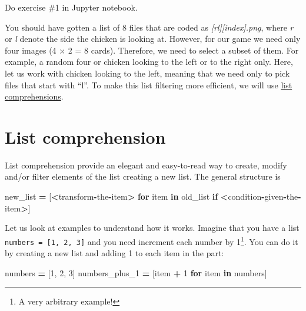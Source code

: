 \documentclass[
]{book}
\newenvironment{Shaded}{\begin{snugshade}}{\end{snugshade}}
\newcommand{\ControlFlowTok}[1]{\textcolor[rgb]{0.13,0.29,0.53}{\textbf{#1}}}
\newcommand{\DecValTok}[1]{\textcolor[rgb]{0.00,0.00,0.81}{#1}}
\newcommand{\KeywordTok}[1]{\textcolor[rgb]{0.13,0.29,0.53}{\textbf{#1}}}
\newcommand{\NormalTok}[1]{#1}
\newcommand{\OperatorTok}[1]{\textcolor[rgb]{0.81,0.36,0.00}{\textbf{#1}}}
\begin{document}
Do exercise \#1 in Jupyter notebook.

You should have gotten a list of 8 files that are coded as \emph{{[}r\textbar l{]}{[}index{]}.png}, where \emph{r} or \emph{l} denote the side the chicken is looking at. However, for our game we need only four images (4 × 2 = 8 cards). Therefore, we need to select a subset of them. For example, a random four or chicken looking to the left or to the right only. Here, let us work with chicken looking to the left, meaning that we need only to pick files that start with ``l''. To make this list filtering more efficient, we will use \href{https://docs.python.org/3/tutorial/datastructures.html\#list-comprehensions}{list comprehensions}.

\hypertarget{list-comprehension}{%
\section{List comprehension}\label{list-comprehension}}

List comprehension provide an elegant and easy-to-read way to create, modify and/or filter elements of the list creating a new list. The general structure is

\begin{Shaded}
\begin{Highlighting}[]
\NormalTok{new\_list }\OperatorTok{=}\NormalTok{ [}\OperatorTok{\textless{}}\NormalTok{transform}\OperatorTok{{-}}\NormalTok{the}\OperatorTok{{-}}\NormalTok{item}\OperatorTok{\textgreater{}} \ControlFlowTok{for}\NormalTok{ item }\KeywordTok{in}\NormalTok{ old\_list }\ControlFlowTok{if} \OperatorTok{\textless{}}\NormalTok{condition}\OperatorTok{{-}}\NormalTok{given}\OperatorTok{{-}}\NormalTok{the}\OperatorTok{{-}}\NormalTok{item}\OperatorTok{\textgreater{}}\NormalTok{]}
\end{Highlighting}
\end{Shaded}

Let us look at examples to understand how it works. Imagine that you have a list \texttt{numbers\ =\ {[}1,\ 2,\ 3{]}} and you need increment each number by 1\footnote{A very arbitrary example!}. You can do it by creating a new list and adding 1 to each item in the part:

\begin{Shaded}
\begin{Highlighting}[]
\NormalTok{numbers }\OperatorTok{=}\NormalTok{ [}\DecValTok{1}\NormalTok{, }\DecValTok{2}\NormalTok{, }\DecValTok{3}\NormalTok{]}
\NormalTok{numbers\_plus\_1 }\OperatorTok{=}\NormalTok{ [item }\OperatorTok{+} \DecValTok{1} \ControlFlowTok{for}\NormalTok{ item }\KeywordTok{in}\NormalTok{ numbers]}
\end{Highlighting}
\end{Shaded}
\end{document}
